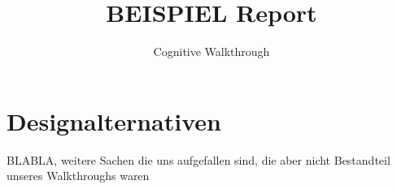 \documentclass[fontsize=12pt,a4paper]{scrartcl}
\begin{document}
\titlehead{
\texttt{[image: figures/uni-wb-hci-header]}
}

\subject{Wintersemester 2014/2015\\ Einführung in die Mensch-Computer-Interaktion}

\title{BEISPIEL Report}

\subtitle{Cognitive Walkthrough}

\publishers{
Benedikt Pfaff, Matrikelnummer 2060170\\
Armin Beutel, Matrikelnummer 1790705\\
Johannes Grohmann, Matrikelnummer 1234567\\
Thomas Handwerker, Matrikelnummer 1995289\\
Alexander Werthmann, Matrikelnummer 1234567\\[3em] 
\normalsize Supervisors: Chris Zimmerer, Kristof Korwisi}

\maketitle

\setcounter{page}{0}
\thispagestyle{empty}

\newpage

\setcounter{page}{1}


\tableofcontents

\newpage

\setcounter{page}{1}

{}

{}

{}
{}
{}
{}
{}
{}

{}


%

\newpage
\appendix

\section{Designalternativen}
BLABLA, weitere Sachen die uns aufgefallen sind, die aber nicht Bestandteil unseres Walkthroughs waren
\end{document}
